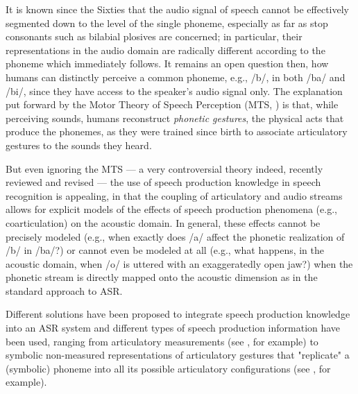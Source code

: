 It is known since the Sixties \cite{liberman1} that the audio signal of speech
cannot be effectively segmented down to the level of the single phoneme,
especially as far as stop consonants such as bilabial plosives
are concerned; in particular, their representations in the audio domain are
radically different according to the phoneme which immediately follows.
It remains an open question then, how humans can distinctly perceive a common
phoneme, e.g., /b/, in both /ba/ and /bi/, since they have access to the speaker's
audio signal only. The explanation put forward by the Motor Theory of Speech Perception
(MTS, \cite{liberman2}) is that, while perceiving sounds, humans reconstruct
\emph{phonetic gestures}, the physical acts that produce the phonemes, as they were
trained since birth to associate articulatory gestures to the sounds they heard.

But even ignoring the MTS --- a very controversial theory indeed, recently reviewed and
revised \cite{galant,massaro} --- the use of speech production knowledge in speech recognition
is appealing, in that the coupling of articulatory and audio streams allows for explicit models
of the effects of speech production phenomena (e.g., coarticulation) on the acoustic domain.
In general, these effects cannot be precisely modeled (e.g., when exactly does /a/ affect the phonetic
realization of /b/ in /ba/?) or cannot even be modeled at all (e.g., what happens, in the acoustic domain,
when /o/ is uttered with an exaggeratedly open jaw?) when the phonetic stream is directly mapped
onto the acoustic dimension as in the standard approach to ASR.  

Different solutions have been proposed to integrate speech production knowledge into an ASR system
and different types of speech production information have been used, ranging from articulatory
measurements (see \cite{zlokarnik,stephenson,wrench}, for example) to symbolic non-measured
representations of articulatory gestures that "replicate" a (symbolic) phoneme into all its
possible articulatory configurations
(see \cite{richardson, livescu}, for example).
   

